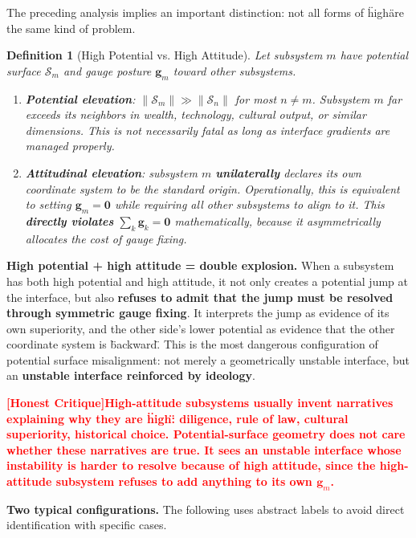 \documentclass[12pt,a4paper]{article}
\newtheorem{definition}[theorem]{Definition}
\theoremstyle{remark}
\newcommand{\honestcrit}[1]{%
    \textcolor{red}{\textbf{[Honest Critique]#1}}%
}
\begin{document}
The preceding analysis implies an important distinction: not all forms of \"high\" are the same kind of problem.

\begin{definition}[High Potential vs. High Attitude]\label{def:two_highs}
Let subsystem $m$ have potential surface $\mathcal{S}_m$ and gauge posture $\mathbf{g}_m$ toward other subsystems.
\begin{enumerate}[label=(\roman*)]
    \item \textbf{Potential elevation}: $\|\mathcal{S}_m\| \gg \|\mathcal{S}_n\|$ for most $n \neq m$. Subsystem $m$ far exceeds its neighbors in wealth, technology, cultural output, or similar dimensions. This is not necessarily fatal as long as interface gradients are managed properly.
    \item \textbf{Attitudinal elevation}: subsystem $m$ \textbf{unilaterally} declares its own coordinate system to be the standard origin. Operationally, this is equivalent to setting $\mathbf{g}_m = \mathbf{0}$ while requiring all other subsystems to align to it. This \textbf{directly violates} $\sum_k \mathbf{g}_k = \mathbf{0}$ mathematically, because it asymmetrically allocates the cost of gauge fixing.
\end{enumerate}
\end{definition}

\textbf{High potential + high attitude = double explosion.} When a subsystem has both high potential and high attitude, it not only creates a potential jump at the interface, but also \textbf{refuses to admit that the jump must be resolved through symmetric gauge fixing}. It interprets the jump as evidence of its own superiority, and the other side's lower potential as evidence that the other coordinate system is \"backward\". This is the most dangerous configuration of potential surface misalignment: not merely a geometrically unstable interface, but an \textbf{unstable interface reinforced by ideology}.

\honestcrit{High-attitude subsystems usually invent narratives explaining why they are \"high\": diligence, rule of law, cultural superiority, historical choice. Potential-surface geometry does not care whether these narratives are true. It sees an unstable interface whose instability is harder to resolve because of high attitude, since the high-attitude subsystem refuses to add anything to its own $\mathbf{g}_m$.}

\textbf{Two typical configurations.} The following uses abstract labels to avoid direct identification with specific cases.
\end{document}
